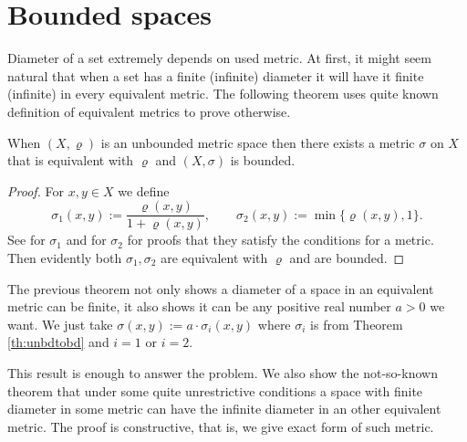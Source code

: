 \section{Bounded spaces}

Diameter of a set extremely depends on used metric. At first, it might seem natural that when a set has a finite (infinite) diameter it will have it finite (infinite) in every equivalent metric. The following theorem uses quite known definition of equivalent metrics to prove otherwise.

\begin{theorem} \label{th:unbdtobd}
When $(X,\varrho)$ is an unbounded metric space then there exists a metric $\sigma$ on $X$ that is equivalent with $\varrho$ and $(X,\sigma)$ is bounded.
\end{theorem}
\begin{proof}
For $x,y\in X$ we define
\[
	\sigma_1(x,y):=\frac{\varrho(x,y)}{1+\varrho(x,y)},\qquad\sigma_2(x,y):=\min\{\varrho(x,y), 1\}.
\]
See \cite[p.~22]{copson88} for $\sigma_1$ and \cite[p.~250]{engelking89} for $\sigma_2$ for proofs that they satisfy the conditions for a metric. Then evidently both $\sigma_1, \sigma_2$ are equivalent with $\varrho$ and are bounded.
\end{proof}

The previous theorem not only shows a diameter of a space in an equivalent metric can be finite, it also shows it can be any positive real number $a>0$ we want. We just take $\sigma(x,y):=a\cdot\sigma_i(x,y)$ where $\sigma_i$ is from Theorem \ref{th:unbdtobd} and $i=1$ or $i=2$.

This result is enough to answer the problem. We also show the not-so-known theorem that under some quite unrestrictive conditions a space with finite diameter in some metric can have the infinite diameter in an other equivalent metric. The proof is constructive, that is, we give exact form of such metric.


